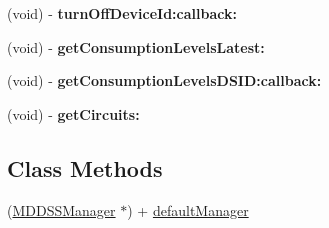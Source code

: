 \begin{DoxyCompactItemize}
\item 
\hypertarget{interface_m_d_d_s_s_manager_ac96629f2d573ee6acb469892c649533c}{(void) -\/ {\bfseries turn\-Off\-Device\-Id\-:callback\-:}}\label{interface_m_d_d_s_s_manager_ac96629f2d573ee6acb469892c649533c}

\item 
\hypertarget{interface_m_d_d_s_s_manager_a28b119a86c4ce5baaf5900800b404f74}{(void) -\/ {\bfseries get\-Consumption\-Levels\-Latest\-:}}\label{interface_m_d_d_s_s_manager_a28b119a86c4ce5baaf5900800b404f74}

\item 
\hypertarget{interface_m_d_d_s_s_manager_a84579d1873d6ca19a693c972296ebdcc}{(void) -\/ {\bfseries get\-Consumption\-Levels\-D\-S\-I\-D\-:callback\-:}}\label{interface_m_d_d_s_s_manager_a84579d1873d6ca19a693c972296ebdcc}

\item 
\hypertarget{interface_m_d_d_s_s_manager_ae616b77a6cd640f66217ea2aa70bc8a1}{(void) -\/ {\bfseries get\-Circuits\-:}}\label{interface_m_d_d_s_s_manager_ae616b77a6cd640f66217ea2aa70bc8a1}

\end{DoxyCompactItemize}
\subsection*{Class Methods}
\begin{DoxyCompactItemize}
\item 
(\hyperlink{interface_m_d_d_s_s_manager}{M\-D\-D\-S\-S\-Manager} $\ast$) + \hyperlink{interface_m_d_d_s_s_manager_af0359d38979df1d414575dfb7aa6b537}{default\-Manager}
\end{DoxyCompactItemize}
